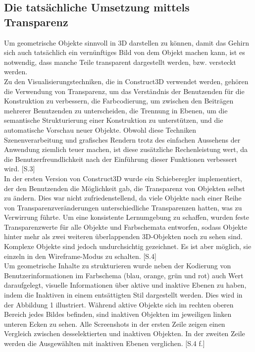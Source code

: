 \documentclass[deutsch]{llncs}
\begin{document}
\subsection{Die tatsächliche Umsetzung mittels Transparenz}
\label{subsec:}
Um geometrische Objekte sinnvoll in 3D darstellen zu können, damit das Gehirn sich auch tatsächlich ein vernünftiges Bild von dem Objekt machen kann,
ist es notwendig, dass manche Teile transparent dargestellt werden, bzw. versteckt werden. \\
Zu den Visualisierungstechniken, die in Construct3D verwendet werden, gehören die Verwendung von Transparenz, um das Verständnis der 
Benutzenden für die Konstruktion zu verbessern, die Farbcodierung, um zwischen den Beiträgen mehrerer Benutzenden zu unterscheiden, 
die Trennung in Ebenen, um die semantische Strukturierung einer Konstruktion zu unterstützen, und die automatische Vorschau neuer Objekte. 
Obwohl diese Techniken Szenenverarbeitung und grafisches Rendern trotz des einfachen Aussehens der Anwendung ziemlich teuer machen, 
ist diese zusätzliche Rechenleistung wert, da die Benutzerfreundlichkeit nach der Einführung dieser Funktionen verbessert wird. [S.3]\\
In der ersten Version von Construct3D wurde ein Schieberegler implementiert, der den Benutzenden die Möglichkeit gab, die Transparenz von 
Objekten selbst zu ändern. Dies war nicht zufriedenstellend, da viele Objekte nach einer Reihe von Transparenzveränderungen unterschiedliche 
Transparenzen hatten, was zu Verwirrung führte. Um eine konsistente Lernumgebung zu schaffen, wurden feste Transparenzwerte für alle Objekte und
 Farbschemata entworfen, sodass Objekte hinter mehr als zwei weiteren überlappenden 3D-Objekten noch zu sehen sind. Komplexe Objekte sind 
jedoch undurchsichtig gezeichnet. Es ist aber möglich, sie einzeln in den Wireframe-Modus zu schalten. [S.4]
\noindent \\
Um geometrische Inhalte zu strukturieren wurde neben der Kodierung von Benutzerinformationen im Farbschema (blau, orange, grün und rot) auch 
Wert daraufgelegt, visuelle Informationen über aktive und inaktive Ebenen zu haben, indem die Inaktiven in einem entsättigten Stil dargestellt werden. 
Dies wird in der Abbildung 1 illustriert. Während aktive Objekte sich im rechten oberen Bereich jedes Bildes befinden, sind inaktiven Objekten im jeweiligen
 linken unteren Ecken zu sehen. Alle Screenshots in der ersten Zeile zeigen einen Vergleich zwischen desselektierten und inaktiven Objekten.
 In der zweiten Zeile werden die Ausgewählten mit inaktiven Ebenen verglichen. [S.4 f.]\\
\end{document}
